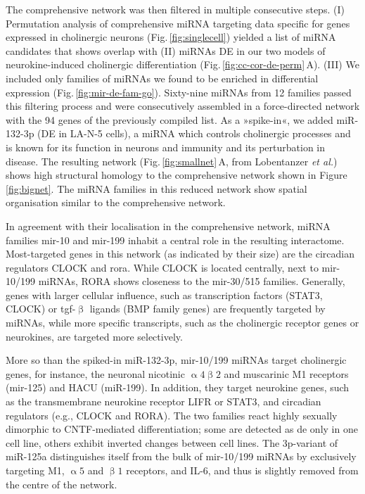 The comprehensive network was then filtered in multiple consecutive steps. (I) Permutation analysis of comprehensive miRNA targeting data specific for genes expressed in cholinergic neurons (Fig.\,\ref{fig:singlecell}) yielded a list of miRNA candidates that shows overlap with (II) miRNAs DE in our two models of neurokine-induced cholinergic differentiation (Fig.\,\ref{fig:cc-cor-de-perm}\,A). (III) We included only families of miRNAs we found to be enriched in differential expression (Fig.\,\ref{fig:mir-de-fam-go}). Sixty-nine miRNAs from 12 families passed this filtering process and were consecutively assembled in a force-directed network with the 94 genes of the previously compiled list. As a »spike-in«, we added miR-132-3p (DE in LA-N-5 cells), a miRNA which controls cholinergic processes\cite{Shaltiel2013, Hanin2018} and is known for its function in neurons\cite{Mellios2011} and immunity\cite{Shaked2009} and its perturbation in disease.\cite{Pichler2017} The resulting network (Fig.\,\ref{fig:smallnet}\,A, from Lobentanzer \emph{et al.}\cite{Lobentanzer2019a}) shows high structural homology to the comprehensive network shown in Figure \ref{fig:bignet}. The miRNA families in this reduced network show spatial organisation similar to the comprehensive network. 

In agreement with their localisation in the comprehensive network, miRNA families mir-10 and mir-199 inhabit a central role in the resulting interactome. Most-targeted genes in this network (as indicated by their size) are the circadian regulators CLOCK and \acs{rora}. While CLOCK is located centrally, next to mir-10/199 miRNAs, RORA shows closeness to the mir-30/515 families. Generally, genes with larger cellular influence, such as transcription factors (STAT3, CLOCK) or \ac{tgf}-$\upbeta$ ligands (BMP family genes) are frequently targeted by miRNAs, while more specific transcripts, such as the cholinergic receptor genes or neurokines, are targeted more selectively.

More so than the spiked-in miR-132-3p, mir-10/199 miRNAs target cholinergic genes, for instance, the neuronal nicotinic $\upalpha4\upbeta2$ and muscarinic M1 receptors (mir-125) and HACU (miR-199). In addition, they target neurokine genes, such as the transmembrane neurokine receptor LIFR or STAT3, and circadian regulators (e.g., CLOCK and RORA). The two families react highly sexually dimorphic to CNTF-mediated differentiation; some are detected as \ac{de} only in one cell line, others exhibit inverted changes between cell lines. The 3p-variant of miR-125a distinguishes itself from the bulk of mir-10/199 miRNAs by exclusively targeting M1, $\upalpha5$ and $\upbeta1$ receptors, and IL-6, and thus is slightly removed from the centre of the network.

